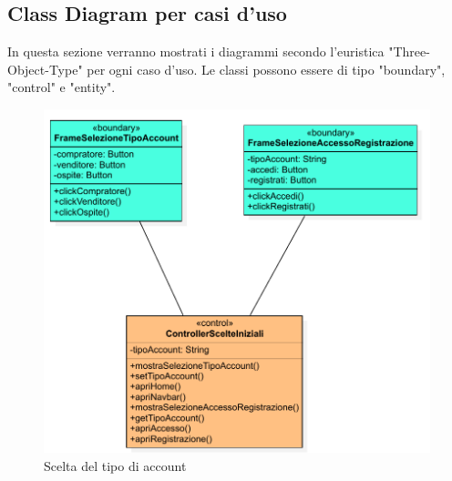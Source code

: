         \subsection{Class Diagram per casi d'uso}
            In questa sezione verranno mostrati i diagrammi secondo l'euristica "Three-Object-Type" per ogni caso d'uso. Le classi possono essere di tipo "boundary", "control" e "entity".
        
            \begin{figure}[htbp!]
                \centering
                    \includegraphics[width=1\linewidth]{Immagini/Diagrammi/Class Diagram/Utente che non ha effettuato l'accesso/ScelteIniziali.pdf}
                \caption{Scelta del tipo di account}
            \end{figure}
            
